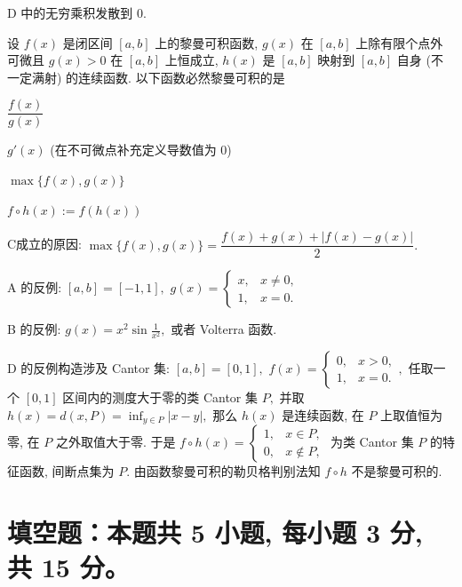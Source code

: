 \begin{solution}
D 中的无穷乘积发散到 $0.$
\end{solution}

\begin{question}
设 $f(x)$ 是闭区间 $[a, b]$ 上的黎曼可积函数, $g(x)$ 在 $[a, b]$ 上除有限个点外可微且 $g(x) > 0$ 在 $[a, b]$ 上恒成立, $h(x)$ 是 $[a, b]$ 映射到 $[a, b]$ 自身 (不一定满射) 的连续函数. 以下函数必然黎曼可积的是 \paren[C]

\begin{choices}
\item $\dfrac{f(x)}{g(x)}$
\item $g'(x)$ (在不可微点补充定义导数值为 $0$)
\item $\max \{ f(x), g(x) \}$
\item $f \circ h(x) := f(h(x))$
\end{choices}
\end{question}

\begin{solution}
C成立的原因: $\max \{ f(x), g(x) \} = \dfrac{f(x) + g(x) + |f(x) - g(x)|}{2}.$

A 的反例: $[a, b] = [-1, 1],$ $g(x) = \begin{cases} 
x, & x \neq 0, \\ 1, & x = 0. \end{cases}$

B 的反例: $g(x) = x^2 \sin\frac{1}{x^2},$ 或者 Volterra 函数.

D 的反例构造涉及 Cantor 集: $[a, b] = [0, 1],$ $f(x) = \begin{cases} 0, & x > 0, \\ 1, & x = 0. \end{cases},$ 任取一个 $[0, 1]$ 区间内的测度大于零的类 Cantor 集 $P,$ 并取 $\displaystyle h(x) = d(x, P) = \inf_{y\in P} |x - y|,$ 那么 $h(x)$ 是连续函数, 在 $P$ 上取值恒为零, 在 $P$ 之外取值大于零. 于是 $f\circ h(x) = \begin{cases} 1, & x \in P, \\ 0, & x \not \in P, \end{cases}$ 为类 Cantor 集 $P$ 的特征函数, 间断点集为 $P.$ 由函数黎曼可积的勒贝格判别法知 $f\circ h$ 不是黎曼可积的.
\end{solution}


\section{填空题：本题共 5 小题, 每小题 3 分, 共 15 分。}

